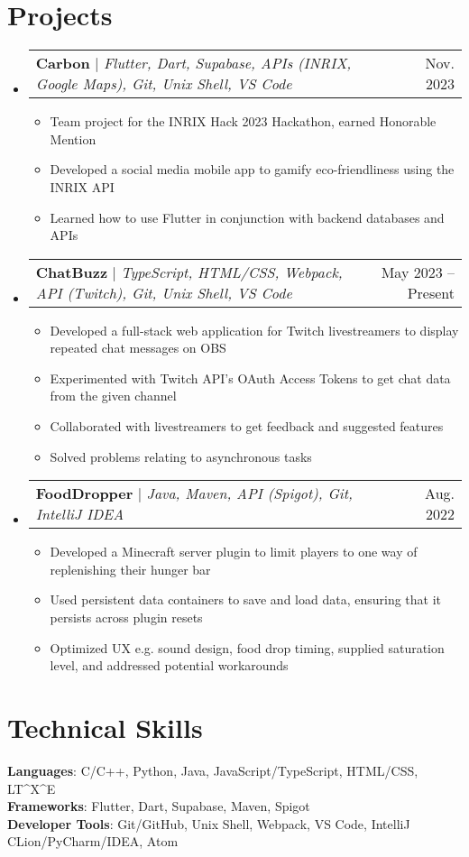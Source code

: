 \documentclass[letterpaper,11pt]{article}
\makeatletter
\newcommand{\resumeItem}[1]{
  \item\small{
    {#1 \vspace{-2pt}}
  }
}
\newcommand{\resumeProjectHeading}[2]{
    \item
    \begin{tabular*}{0.97\textwidth}{l@{\extracolsep{\fill}}r}
      \small#1 & #2 \\
    \end{tabular*}\vspace{-7pt}
}
\newcommand{\resumeSubHeadingListStart}{\begin{itemize}[leftmargin=0.15in, label={}]}
\newcommand{\resumeSubHeadingListEnd}{\end{itemize}}
\newcommand{\resumeItemListStart}{\begin{itemize}}
\newcommand{\resumeItemListEnd}{\end{itemize}\vspace{-5pt}}
\makeatother
\begin{document}
\section{Projects}
    \resumeSubHeadingListStart
      \resumeProjectHeading
          {\textbf{Carbon} $|$ \emph{Flutter, Dart, Supabase, APIs (INRIX, Google Maps), Git, Unix Shell, VS Code}}{Nov. 2023}
          \resumeItemListStart
            \resumeItem{Team project for the INRIX Hack 2023 Hackathon, earned Honorable Mention}
            \resumeItem{Developed a social media mobile app to gamify eco-friendliness using the INRIX API}
            \resumeItem{Learned how to use Flutter in conjunction with backend databases and APIs}
          \resumeItemListEnd
      \resumeProjectHeading
          {\textbf{ChatBuzz} $|$ \emph{TypeScript, HTML/CSS, Webpack, API (Twitch), Git, Unix Shell, VS Code}}{May 2023 -- Present}
          \resumeItemListStart
            \resumeItem{Developed a full-stack web application for Twitch livestreamers to display repeated chat messages on OBS}
            \resumeItem{Experimented with Twitch API’s OAuth Access Tokens to get chat data from the given channel}
            \resumeItem{Collaborated with livestreamers to get feedback and suggested features}
            \resumeItem{Solved problems relating to asynchronous tasks}
          \resumeItemListEnd
      \resumeProjectHeading
          {\textbf{FoodDropper} $|$ \emph{Java, Maven, API (Spigot), Git, IntelliJ IDEA}}{Aug. 2022}
          \resumeItemListStart
            \resumeItem{Developed a Minecraft server plugin to limit players to one way of replenishing their hunger bar}
            \resumeItem{Used persistent data containers to save and load data, ensuring that it persists across plugin resets}
            \resumeItem{Optimized UX e.g. sound design, food drop timing, supplied saturation level, and addressed potential workarounds}
          \resumeItemListEnd
    \resumeSubHeadingListEnd

\section{Technical Skills}
 \begin{itemize}[leftmargin=0.15in, label={}]
    \small{\item{
     \textbf{Languages}{: C/C++, Python, Java, JavaScript/TypeScript, HTML/CSS, LT\textasciicircum X\textasciicircum E} \\
     \textbf{Frameworks}{: Flutter, Dart, Supabase, Maven, Spigot} \\
     \textbf{Developer Tools}{: Git/GitHub, Unix Shell, Webpack, VS Code, IntelliJ CLion/PyCharm/IDEA, Atom} \\
     }}
 \end{itemize}
\end{document}
